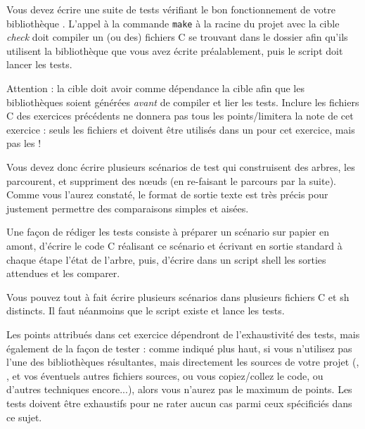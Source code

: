

\vspace*{0.7cm}

\noindent {}

\bigskip

\noindent Vous devez écrire une suite de tests vérifiant le bon fonctionnement de votre bibliothèque .
L'appel à la commande \texttt{make} à la racine du projet avec la cible \textit{check} doit compiler un (ou des) fichiers C se trouvant dans le dossier  afin qu'ils utilisent la bibliothèque que vous avez écrite préalablement, puis le script  doit lancer les tests.

Attention : la cible  doit avoir comme dépendance la cible  afin que les bibliothèques soient générées \textit{avant} de compiler et lier les tests.
Inclure les fichiers C des exercices précédents ne donnera pas tous les points/limitera la note de cet exercice : seuls les fichiers  et  doivent être utilisés dans un  pour cet exercice, mais pas les  !

\bigskip

\noindent Vous devez donc écrire plusieurs scénarios de test qui construisent des arbres, les parcourent, et suppriment des nœuds (en re-faisant le parcours par la suite).
Comme vous l'aurez constaté, le format de sortie texte est très précis pour justement permettre des comparaisons simples et aisées.

\noindent Une façon de rédiger les tests consiste à préparer un scénario sur papier en amont, d'écrire le code C réalisant ce scénario et écrivant en sortie standard à chaque étape l'état de l'arbre, puis, d'écrire dans un script shell les sorties attendues et les comparer.

\medskip

\noindent Vous pouvez tout à fait écrire plusieurs scénarios dans plusieurs fichiers C et sh distincts.
Il faut néanmoins que le script  existe et lance les tests.

\bigskip

\noindent Les points attribués dans cet exercice dépendront de l'exhaustivité des tests, mais également de la façon de tester : comme indiqué plus haut, si vous n'utilisez pas l'une des bibliothèques résultantes, mais directement les sources de votre projet (, , et vos éventuels autres fichiers sources, ou vous copiez/collez le code, ou d'autres techniques encore...), alors vous n'aurez pas le maximum de points.
Les tests doivent être exhaustifs pour ne rater aucun cas parmi ceux spécificiés dans ce sujet.
